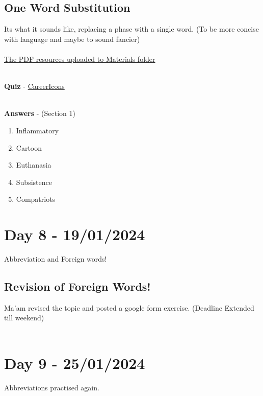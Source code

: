 \documentclass[a4paper,30pt]{report}
\begin{document}
    \section{One Word Substitution}
      Its what it sounds like, replacing a phase with a single word. (To be more concise with language and maybe to sound fancier)\\\\
      \underline{The PDF resources uploaded to Materials folder}\\\\

      \par \textbf{Quiz} - \href{https://careericons.com/general-english-mcq/one-word-substitution/section-1-question-answer/154-1/}{CareerIcons}\\\\

      \par \textbf{Answers} - (Section 1) 
        \begin{enumerate}
          \item Inflammatory
          \item Cartoon
          \item Euthanasia
          \item Subsistence
          \item Compatriots
        \end{enumerate}
  


  \chapter{Day 8 - 19/01/2024} %
  \label{chap:Day 8 - 19/01/2024}
    Abbreviation and Foreign words!
    \section{Revision of Foreign Words!}
       Ma'am revised the topic and posted a google form exercise. (Deadline Extended till weekend)\\\\

  \chapter{Day 9 - 25/01/2024} %
  \label{chap:Day 9 - 25/01/2024}
    Abbreviations practised again. 
\end{document}
